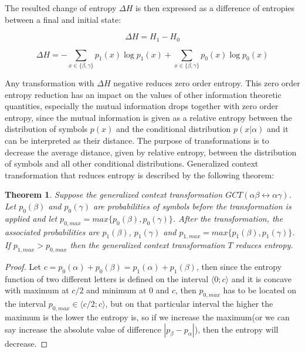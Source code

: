 \documentclass[smallabstract,smallcaptions]{dccpaper}
\newtheorem{theorem}{Theorem}
\newtheorem{proof}{Proof}
\begin{document}
The resulted change of entropy $\Delta H$ is then expressed as a difference of entropies between a final and initial state:

\[
\Delta H = H_{1} - H_{0} 
\]

\begin{equation}
\label{eq:dH}
\Delta H = -\sum_{x\in\{\beta,\gamma\}}p_{1}(x)\log p_{1}(x) + \sum_{x\in\{\beta,\gamma\}}p_{0}(x)\log p_{0}(x)
\end{equation}

Any transformation with $\Delta H$ negative reduces zero order entropy. This zero order entropy reduction has an impact on the values of other information theoretic\cite{Cover} quantities, especially the mutual information drops together with zero order entropy, since the mutual information is given as a relative entropy between the distribution of symbols $p(x)$ and the conditional distribution $p(x|\alpha)$ and it can be interpreted as their distance. The purpose of transformations is to decrease the average distance, given by relative entropy, between the distribution of symbols and all other conditional distributions. Generalized context transformation that reduces entropy is described by the following theorem:

\begin{theorem}
\label{thm:reduction}
Suppose the generalized context transformation $GCT(\alpha\beta\leftrightarrow\alpha\gamma)$. Let $p_{0}(\beta)$ and $p_{0}(\gamma)$ are probabilities of symbols before the transformation is applied and let $p_{0,max}=max\{p_{0}(\beta),p_{0}(\gamma)\}$. After the transformation, the associated probabilities are $p_{1}(\beta)$, $p_{1}(\gamma)$ and $p_{1,max}=max\{p_{1}(\beta),p_{1}(\gamma)\}$. If $p_{1,max} > p_{0,max}$ then the generalized context transformation $T$ reduces entropy.
\end{theorem}

\begin{proof}
Let $c=p_{0}(\alpha)+p_{0}(\beta)=p_{1}(\alpha)+p_{1}(\beta)$, then since the entropy function of two different letters is defined on the interval $\langle 0;c\rangle$ and it is concave with maximum at $c/2$ and minimum at $0$ and $c$, then $p_{0,max}$ has to be located on the interval $p_{0,max}\in\langle c/2;c\rangle$, but on that particular interval the higher the maximum is the lower the entropy is, so if we increase the maximum(or we can say increase the absolute value of difference  $|p_{\beta}-p_{\alpha}|$), then the entropy will decrease.
\end{proof}
\end{document}
